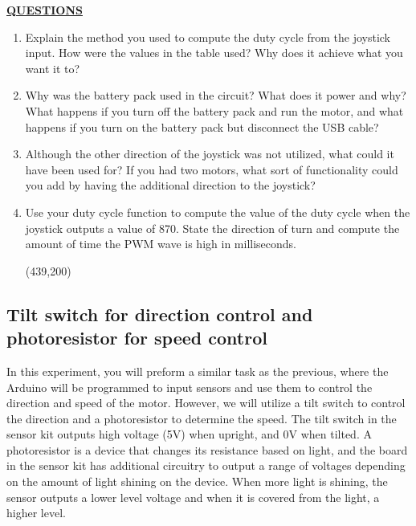 \documentclass[12pt]{article}
\begin{document}
\textbf{\underline{QUESTIONS}}
\begin{enumerate}
    \item Explain the method you used to compute the duty cycle from the joystick input. How were the values in the table used? Why does it achieve what you want it to? 
        \fillwithlines{1in}
        
    \item Why was the battery pack used in the circuit? What does it power and why?  What happens if you turn off the battery pack and run the motor, and what happens if you turn on the battery pack but disconnect the USB cable?
        \fillwithlines{0.7in}

    \item Although the other direction of the joystick was not utilized, what could it have been used for? If you had two motors, what sort of functionality could you add by having the additional direction to the joystick?
        \fillwithlines{1in}

    \item Use your duty cycle function to compute the value of the duty cycle when the joystick outputs a value of 870. State the direction of turn and compute the amount of time the PWM wave is high in milliseconds.
    
        \framebox(439,200){}
\end{enumerate}         

\checkoffsubsub %

\subsection{Tilt switch for direction control and photoresistor for speed control}

In this experiment, you will preform a similar task as the previous, where the Arduino will be programmed to input sensors and use them to control the direction and speed of the motor. However, we will utilize a tilt switch to control the direction and a photoresistor to determine the speed. The tilt switch in the sensor kit outputs high voltage (5V) when upright, and 0V when tilted. A photoresistor is a device that changes its resistance based on light, and the board in the sensor kit has additional circuitry to output a range of voltages depending on the amount of light shining on the device. When more light is shining, the sensor outputs a lower level voltage and when it is covered from the light, a higher level. 
\end{document}

